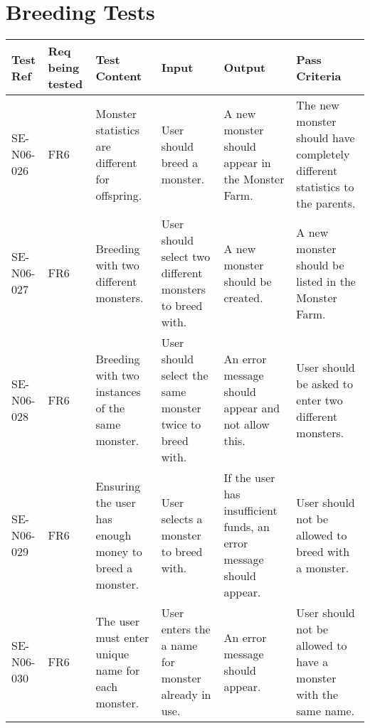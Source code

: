 \documentclass[titlepage]{article}
\begin{document}
\section{Breeding Tests}
\begin{tabular}{|p{1cm}|p{1cm}|p{3cm}|p{3cm}|p{2cm}|p{3cm}|}
\hline
Test Ref & Req being tested & Test Content & Input & Output & Pass Criteria \\ 
\hline
SE-N06-026 & FR6 & Monster statistics are different for offspring. & User should breed a monster. & A new monster should appear in the Monster Farm. & The new monster should have completely different statistics to the parents. \\
\hline
SE-N06-027 & FR6 & Breeding with two different monsters. & User should select two different monsters to breed with. & A new monster should be created. & A new monster should be listed in the Monster Farm. \\
\hline
SE-N06-028 & FR6 & Breeding with two instances of the same monster. & User should select the same monster twice to breed with. & An error message should appear and not allow this. & User should be asked to enter two different monsters.\\
\hline
SE-N06-029 & FR6 & Ensuring the user has enough money to breed a monster. & User selects a monster to breed with. & If the user has insufficient funds, an error message should appear. & User should not be allowed to breed with a monster.\\
\hline
SE-N06-030 & FR6 & The user must enter unique name for each monster. & User enters the a name for monster already in use. & An error message should appear. & User should not be allowed to have a monster with the same name.\\
\hline
\end{tabular}
\newpage
\end{document}
